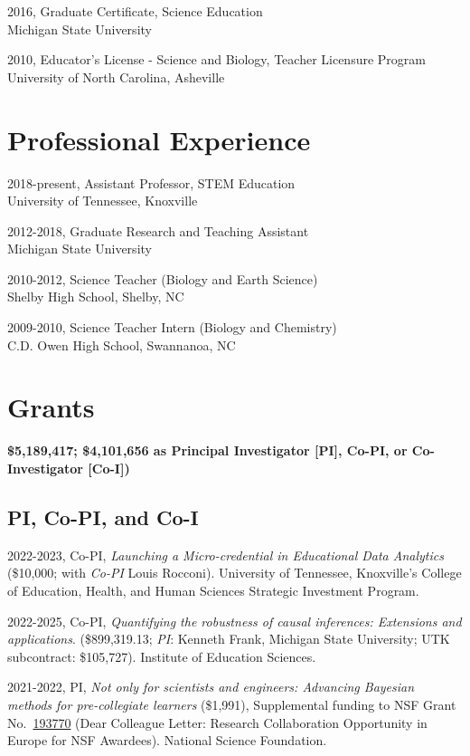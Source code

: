 \documentclass[
  14,
]{article}
\begin{document}
2016, Graduate Certificate, Science Education\\
Michigan State University

2010, Educator's License - Science and Biology, Teacher Licensure
Program\\
University of North Carolina, Asheville

\hypertarget{professional-experience}{%
\section{Professional Experience}\label{professional-experience}}

2018-present, Assistant Professor, STEM Education\\
University of Tennessee, Knoxville

2012-2018, Graduate Research and Teaching Assistant\\
Michigan State University

2010-2012, Science Teacher (Biology and Earth Science)\\
Shelby High School, Shelby, NC

2009-2010, Science Teacher Intern (Biology and Chemistry)\\
C.D. Owen High School, Swannanoa, NC

\hypertarget{grants}{%
\section{Grants}\label{grants}}

\textbf{\$5,189,417; \$4,101,656 as Principal Investigator {[}PI{]},
Co-PI, or Co-Investigator {[}Co-I{]})}

\hypertarget{pi-co-pi-and-co-i}{%
\subsection{PI, Co-PI, and Co-I}\label{pi-co-pi-and-co-i}}

2022-2023, Co-PI, \emph{Launching a Micro-credential in Educational Data
Analytics} (\$10,000; with \emph{Co-PI} Louis Rocconi). University of
Tennessee, Knoxville's College of Education, Health, and Human Sciences
Strategic Investment Program.

2022-2025, Co-PI, \emph{Quantifying the robustness of causal inferences:
Extensions and applications}. (\$899,319.13; \emph{PI}: Kenneth Frank,
Michigan State University; UTK subcontract: \$105,727). Institute of
Education Sciences.

2021-2022, PI, \emph{Not only for scientists and engineers: Advancing
Bayesian methods for pre-collegiate learners} (\$1,991), Supplemental
funding to NSF Grant
No.~\href{https://www.nsf.gov/awardsearch/showAward?AWD_ID=1937700\&HistoricalAwards=false}{193770}
(Dear Colleague Letter: Research Collaboration Opportunity in Europe for
NSF Awardees). National Science Foundation.
\end{document}
